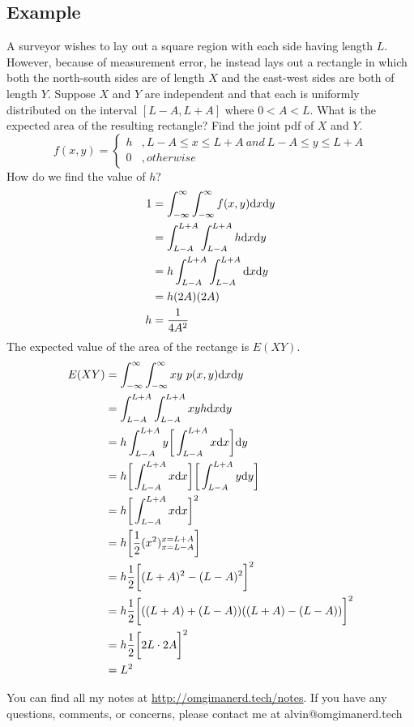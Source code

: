 \documentclass[letterpaper, 12pt]{math}
\begin{document}
\subsection*{Example}
A surveyor wishes to lay out a square region with each side having length
\( L \). However, because of measurement error, he instead lays out a
rectangle in which both the north-south sides are of length \( X \) and
the east-west sides are both of length \( Y \). Suppose \( X \) and \( Y \)
are independent and that each is uniformly distributed on the interval
\( [L-A,L+A] \) where \( 0<A<L \). What is the expected area of the
resulting rectangle? Find the joint pdf of \( X \) and \( Y \).
\[ f(x,y) = \begin{cases}
  h &, L-A\leq x\leq L+A\ and\ L-A\leq y\leq L+A \\
  0 &, otherwise
\end{cases} \]
How do we find the value of \( h \)?
\begin{align*}
  1 &= \int_{-\infty}^{\infty}\int_{-\infty}^{\infty}f(x,y)\mathrm{d}{x}\mathrm{d}{y} \\
  &= \int_{L-A}^{L+A}\int_{L-A}^{L+A}h\mathrm{d}{x}\mathrm{d}{y} \\
  &= h\int_{L-A}^{L+A}\int_{L-A}^{L+A}\mathrm{d}{x}\mathrm{d}{y} \\
  &= h(2A)(2A) \\
  h &= \frac{1}{4A^{2}}
\end{align*}
The expected value of the area of the rectange is \( E(XY) \).
\begin{align*}
  E(XY) &= \int_{-\infty}^{\infty}\int_{-\infty}^{\infty}
    xy\ p(x,y)\mathrm{d}{x}\mathrm{d}{y} \\
  &= \int_{L-A}^{L+A}\int_{L-A}^{L+A}xyh\mathrm{d}{x}\mathrm{d}{y} \\
  &= h\int_{L-A}^{L+A}y\bigg[\int_{L-A}^{L+A}x\mathrm{d}{x}\bigg]\mathrm{d}{y} \\
  &= h\bigg[\int_{L-A}^{L+A}x\mathrm{d}{x}\bigg]
    \bigg[\int_{L-A}^{L+A}y\mathrm{d}{y}\bigg] \\
  &= h\bigg[\int_{L-A}^{L+A}x\mathrm{d}{x}\bigg]^{2} \\
  &= h\bigg[\frac{1}{2}(x^{2})_{x=L-A}^{x=L+A}\bigg] \\
  &= h\frac{1}{2}\bigg[(L+A)^{2}-(L-A)^{2}\bigg]^{2} \\
  &= h\frac{1}{2}\bigg[((L+A)+(L-A))((L+A)-(L-A))\bigg]^{2} \\
  &= h\frac{1}{2}\bigg[2L\cdot2A\bigg]^{2} \\
  &= L^{2}
\end{align*}

\begin{center}
  You can find all my notes at \url{http://omgimanerd.tech/notes}. If you have
  any questions, comments, or concerns, please contact me at
  alvin@omgimanerd.tech
\end{center}
\end{document}
